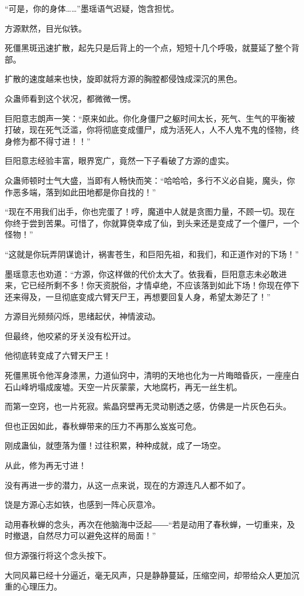 \begin{this_body}
“可是，你的身体……”墨瑶语气迟疑，饱含担忧。

方源默然，目光似铁。

死僵黑斑迅速扩散，起先只是后背上的一个点，短短十几个呼吸，就蔓延了整个背部。

扩散的速度越来也快，旋即就将方源的胸膛都侵蚀成深沉的黑色。

众蛊师看到这个状况，都微微一愣。

巨阳意志朗声一笑：“原来如此。你化身僵尸之躯时间太长，死气、生气的平衡被打破，现在死气泛滥，你将彻底变成僵尸，成为活死人，人不人鬼不鬼的怪物，终身修为都不得寸进！！”

巨阳意志经验丰富，眼界宽广，竟然一下子看破了方源的虚实。

众蛊师顿时士气大盛，当即有人畅快而笑：“哈哈哈，多行不义必自毙，魔头，你作恶多端，落到如此田地都是你自找的！”

“现在不用我们出手，你也完蛋了！哼，魔道中人就是贪图力量，不顾一切。现在你终于尝到苦果。可惜了，你就算侥幸成了仙，到头来还是变成了一个僵尸，一个怪物！”

“这就是你玩弄阴谋诡计，祸害苍生，和巨阳先祖，和我们，和正道作对的下场！”

墨瑶意志也劝道：“方源，你这样做的代价太大了。依我看，巨阳意志未必敢进来，它已经所剩不多！你天资脱俗，才情卓绝，不应该落到如此下场！你现在停下还来得及，一旦彻底变成六臂天尸王，再想要回复人身，希望太渺茫了！”

方源目光频频闪烁，思绪起伏，神情波动。

但最终，他咬紧的牙关没有松开过。

他彻底转变成了六臂天尸王！

死僵黑斑令他浑身漆黑，力道仙窍中，清明的天地也化为一片晦暗昏灰，一座座白石山峰坍塌成废墟。天空一片灰蒙蒙，大地腐朽，再无一丝生机。

而第一空窍，也一片死寂。紫晶窍壁再无灵动剔透之感，仿佛是一片灰色石头。

但也正因如此，春秋蝉带来的压力不再那么岌岌可危。

刚成蛊仙，就堕落为僵！过往积累，种种成就，成了一场空。

从此，修为再无寸进！

没有再进一步的潜力，从这一点来说，现在的方源连凡人都不如了。

饶是方源心志如铁，也感到一阵心灰意冷。

动用春秋蝉的念头，再次在他脑海中泛起――“若是动用了春秋蝉，一切重来，及时撤退，自然尽力可以避免这样的局面！”

但方源强行将这个念头按下。

大同风幕已经十分逼近，毫无风声，只是静静蔓延，压缩空间，却带给众人更加沉重的心理压力。


\end{this_body}

